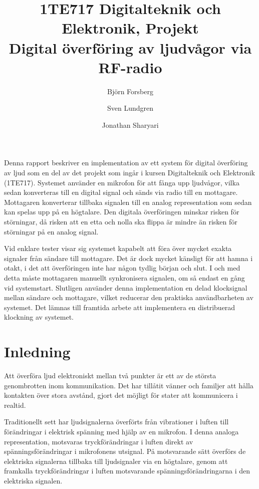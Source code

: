 \documentclass[a4paper,10pt]{article}
\title{{\small 1TE717 Digitalteknik och Elektronik, Projekt} \\ \textbf{Digital överföring av ljudvågor via RF-radio}}
\author{Bj{\"o}rn Forsberg \and Sven Lundgren \and Jonathan Sharyari}
\begin{document}
\maketitle

\abstract

Denna rapport beskriver en implementation av ett system för digital 
överföring av ljud som en del av det projekt som ingår i kursen Digitalteknik 
och Elektronik (1TE717). Systemet använder en mikrofon för att fånga upp 
ljudvågor, vilka sedan konverteras till en digital signal och sänds via radio 
till en mottagare. Mottagaren konverterar tillbaka signalen till en analog 
representation som sedan kan spelas upp på en högtalare. Den digitala 
överföringen minskar risken för störningar, då risken att en etta och nolla ska 
flippa är mindre än risken för störningar på en analog signal.

Vid enklare tester visar sig systemet kapabelt att föra över mycket exakta 
signaler från sändare till mottagare. Det är dock mycket känsligt för att hamna
i otakt, i det att överföringen inte har någon tydlig början och slut. I och med
detta måste mottagaren manuellt synkronisera signalen, om så endast en gång vid 
systemstart. Slutligen använder denna implementation en delad klocksignal mellan 
sändare och mottagare, vilket reducerar den praktiska användbarheten av 
systemet. Det lämnas till framtida arbete att implementera en distribuerad 
klockning av systemet.

\section{Inledning}

Att överföra ljud elektroniskt mellan två punkter är ett av de största 
genombrotten inom kommunikation. Det har tillåtit vänner och familjer  att hålla 
kontakten över stora avstånd, gjort det möjligt för stater att kommunicera i 
realtid.

Traditionellt sett har ljudsignalerna överförts från vibrationer i luften till
förändringar i elektrisk spänning med hjälp av en mikrofon. I denna analoga 
representation, motsvaras tryckförändringar i luften direkt av 
spänningsförändringar i mikrofonens utsignal. På motsvarande sätt överförs de
elektriska signalerna tillbaka till ljudsignaler via en högtalare, genom att 
framkalla tryckförändringar i luften motsvarande spänningsförändringarna i
den elektriska signalen.
\end{document}
